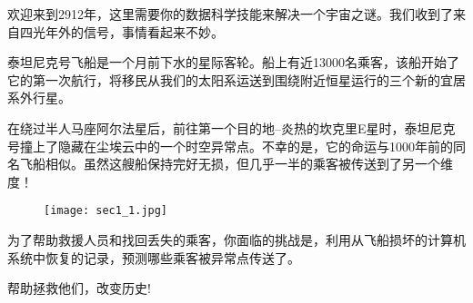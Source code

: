 \documentclass[../main.tex]{subfiles}
\begin{document}
    欢迎来到2912年，这里需要你的数据科学技能来解决一个宇宙之谜。我们收到了来自四光年外的信号，事情看起来不妙。

    泰坦尼克号飞船是一个月前下水的星际客轮。船上有近13000名乘客，该船开始了它的第一次航行，将移民从我们的太阳系运送到围绕附近恒星运行的三个新的宜居系外行星。

    在绕过半人马座阿尔法星后，前往第一个目的地--炎热的坎克里E星时，泰坦尼克号撞上了隐藏在尘埃云中的一个时空异常点。不幸的是，它的命运与1000年前的同名飞船相似。虽然这艘船保持完好无损，但几乎一半的乘客被传送到了另一个维度！

    \begin{figure}[H]
        \centering
        \texttt{[image: sec1\_1.jpg]}
    \end{figure}

    为了帮助救援人员和找回丢失的乘客，你面临的挑战是，利用从飞船损坏的计算机系统中恢复的记录，预测哪些乘客被异常点传送了。

    帮助拯救他们，改变历史!
\end{document}
